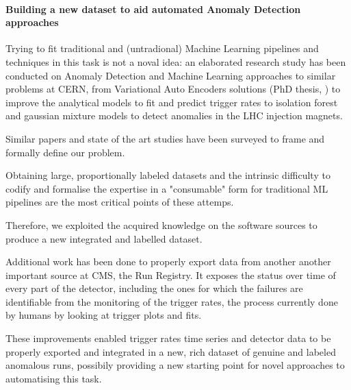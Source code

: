\documentclass[a4, oneside, 10pt, nobib]{memoir}
\begin{document}
\begin{itemize}
		\end{itemize}


		\paragraph{Building a new dataset to aid automated Anomaly Detection approaches}

		Trying to fit traditional and (untradional) Machine Learning pipelines and techniques in this task is not a noval idea: an elaborated research study has been conducted on Anomaly Detection and Machine Learning approaches to similar problems at CERN, from Variational Auto Encoders solutions (PhD thesis, \cite{}) to improve the analytical models to fit and predict trigger rates to isolation forest and gaussian mixture models to detect anomalies in the LHC injection magnets.

		Similar papers and state of the art studies have been surveyed to frame and formally define our problem.

		Obtaining large, proportionally labeled datasets and the intrinsic difficulty to codify and formalise the expertise in a "consumable" form for traditional ML pipelines are the most critical points of these attemps.

		Therefore, we exploited the acquired knowledge on the software sources to produce a new integrated and labelled dataset.

		Additional work has been done to properly export data from another another important source at CMS, the Run Registry. It exposes the status over time of every part of the detector, including the ones for which the failures are identifiable from the monitoring of the trigger rates, the process currently done by humans by looking at trigger plots and fits.

		These improvements enabled trigger rates time series and detector data to be properly exported and integrated in a new, rich dataset of genuine and labeled anomalous runs, possibily providing a new starting point for novel approaches to automatising this task.
\end{document}
